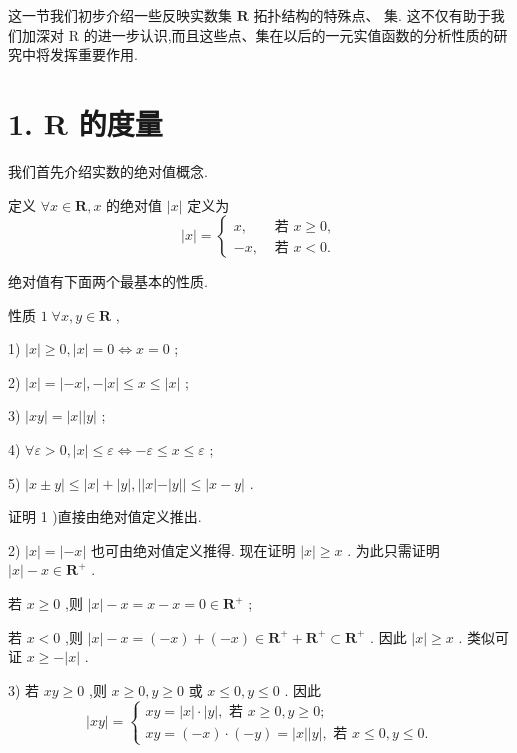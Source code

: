 这一节我们初步介绍一些反映实数集 $\mathbf{R}$ 拓扑结构的特殊点、 集. 这不仅有助于我们加深对 $\mathrm{R}$ 的进一步认识,而且这些点、集在以后的一元实值函数的分析性质的研究中将发挥重要作用.

\section*{1. $\mathbf{R}$ 的度量}

我们首先介绍实数的绝对值概念.

定义 $\forall x \in  \mathbf{R},x$ 的绝对值 $\left| x\right|$ 定义为
$$\left| x\right|  = \left\{  \begin{array}{ll} x, & \text{ 若 }x \geq  0, \\   - x, & \text{ 若 }x < 0. \end{array}\right.$$

绝对值有下面两个最基本的性质.

性质 $1\;\forall x,y \in  \mathbf{R}$ ,

1) $\left| x\right|  \geq  0,\left| x\right|  = 0 \Leftrightarrow  x = 0$ ;

2) $\left| x\right|  = \left| {-x}\right| , - \left| x\right|  \leq  x \leq  \left| x\right|$ ;

3) $\left| {xy}\right|  = \left| x\right| \left| y\right|$ ;

4) $\forall \varepsilon  > 0,\left| x\right|  \leq  \varepsilon  \Leftrightarrow   - \varepsilon  \leq  x \leq  \varepsilon$ ;

5) $\left| {x \pm  y}\right|  \leq  \left| x\right|  + \left| y\right| ,\left| \right| x\left| -\right| y\left| \right|  \leq  \left| {x - y}\right|$ .

证明 1 )直接由绝对值定义推出.

2) $\left| x\right|  = \left| {-x}\right|$ 也可由绝对值定义推得. 现在证明 $\left| x\right|  \geq  x$ . 为此只需证明 $\left| x\right|  - x \in  {\mathbf{R}}^{ + }$ .

若 $x \geq  0$ ,则 $\left| x\right|  - x = x - x = 0 \in  {\mathbf{R}}^{ + }$ ;

若 $x < 0$ ,则 $\left| x\right|  - x = \left( {-x}\right)  + \left( {-x}\right)  \in  {\mathbf{R}}^{ + } + {\mathbf{R}}^{ + } \subset  {\mathbf{R}}^{ + }$ . 因此 $\left| x\right|  \geq  x$ . 类似可证 $x \geq   - \left| x\right|$ .

3) 若 ${xy} \geq  0$ ,则 $x \geq  0,y \geq  0$ 或 $x \leq  0,y \leq  0$ . 因此
$$\left| {xy}\right|  = \left\{  \begin{array}{l} {xy} = \left| x\right|  \cdot  \left| y\right| ,\text{ 若 }x \geq  0,y \geq  0; \\  {xy} = \left( {-x}\right)  \cdot  \left( {-y}\right)  = \left| x\right| \left| y\right| ,\text{ 若 }x \leq  0,y \leq  0. \end{array}\right.$$

